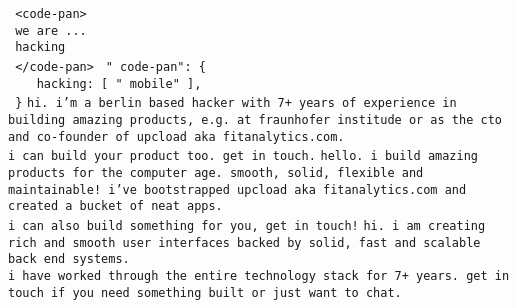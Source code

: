\documentclass[a5paper,landscape]{article}
\newcommand{\blue}[1]{\texttt{\color{Green} #1}}
\newcommand{\red}[1]{\texttt{\color{WildStrawberry} #1}}
\begin{document}
\noindent
\huge
\red{<code-pan>} \\
\blue{we are ...} \\
\blue{hacking }\\
\red{</code-pan>}
\clearpage
\noindent
\blue{"\red{code-pan}":\ \{}\\
\blue{\ \ \red{hacking}:\ [ "\red{mobile}" ],} \\
\blue{\}}
\clearpage
\pagecolor{MidnightBlue}
\color{White}
\noindent
\texttt{hi.
  i'm a berlin based hacker with
  7+ years of experience in building amazing products,
  e.g. at fraunhofer institude or
  as the cto and co-founder of upcload aka
  fitanalytics.com. \\
  i can build your product too.  get in touch.}
\newpage
\noindent
\texttt{hello. i build amazing products for the computer age.
  smooth, solid, flexible and maintainable!
  i've bootstrapped upcload aka fitanalytics.com and
  created a bucket of neat apps.\\
  i can also build something for you, get in touch!}
\newpage
\noindent
\texttt{hi. i am creating rich and smooth
  user interfaces backed by solid, fast and scalable back end
  systems.\\
  i have worked through the entire technology stack for 7+ years.
  get in touch if you need something built or just want to chat.}
\end{document}
